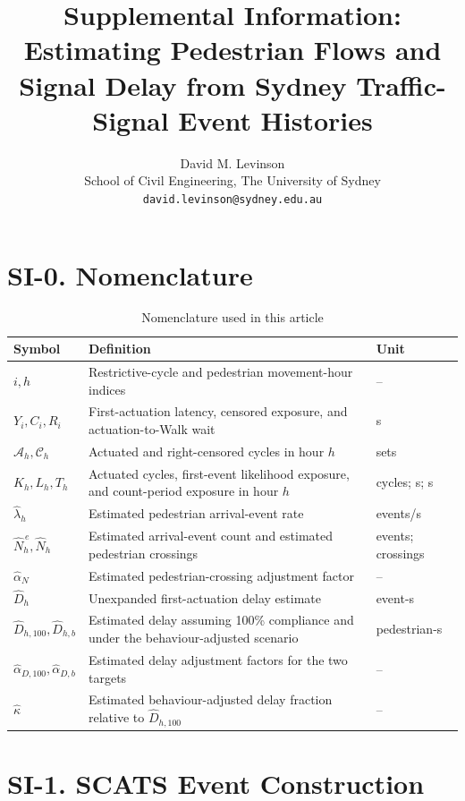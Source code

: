 \documentclass[11pt]{article}
\title{\textbf{Supplemental Information: Estimating Pedestrian Flows and Signal Delay from Sydney Traffic-Signal Event Histories}}
\author{David M. Levinson\\
\small School of Civil Engineering, The University of Sydney\\
\small \texttt{david.levinson@sydney.edu.au}}
\date{}
\begin{document}
\maketitle

\section*{SI-0. Nomenclature}
\begin{table}[htbp]
\centering
\caption{Nomenclature used in this article}
\label{tab:nomenclature}
\footnotesize
\begin{tabular}{@{}p{}p{}p{}@{}}
\toprule
Symbol & Definition & Unit \\
\midrule
$i,h$ & Restrictive-cycle and pedestrian movement-hour indices & -- \\
$Y_i,C_i,R_i$ & First-actuation latency, censored exposure, and actuation-to-Walk wait & s \\
$\mathcal A_h,\mathcal C_h$ & Actuated and right-censored cycles in hour $h$ & sets \\
$K_h,L_h,T_h$ & Actuated cycles, first-event likelihood exposure, and count-period exposure in hour $h$ & cycles; s; s \\
$\widehat\lambda_h$ & Estimated pedestrian arrival-event rate & events/s \\
$\widehat N_h^{\,e},\widehat N_h$ & Estimated arrival-event count and estimated pedestrian crossings & events; crossings \\
$\widehat\alpha_N$ & Estimated pedestrian-crossing adjustment factor & -- \\
$\widehat D_h$ & Unexpanded first-actuation delay estimate & event-s \\
$\widehat D_{h,100},\widehat D_{h,b}$ & Estimated delay assuming 100\% compliance and under the behaviour-adjusted scenario & pedestrian-s \\
$\widehat\alpha_{D,100},\widehat\alpha_{D,b}$ & Estimated delay adjustment factors for the two targets & -- \\
$\widehat\kappa$ & Estimated behaviour-adjusted delay fraction relative to $\widehat D_{h,100}$ & -- \\
\bottomrule
\end{tabular}
\end{table}
\section*{SI-1. SCATS Event Construction}
\end{document}
